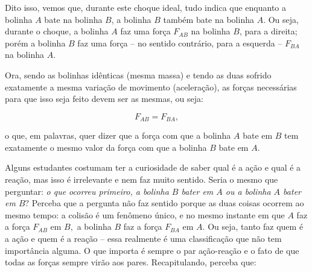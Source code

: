 Dito isso, vemos que, durante este choque ideal, tudo indica que enquanto a bolinha $A$ bate na bolinha $B$, a bolinha $B$ também bate na bolinha $A.$ Ou seja, durante o choque, a bolinha $A$ faz uma força $F_{AB}$ na bolinha $B$, para a direita; porém a bolinha $B$ faz uma força -- no sentido contrário, para a esquerda -- $F_{BA}$ na bolinha $A.$

Ora, sendo as bolinhas idênticas (mesma massa) e tendo as duas sofrido exatamente a mesma variação de movimento (aceleração), as forças necessárias para que isso seja feito devem ser as mesmas, ou seja:

$$ F_{AB} = F_{BA},$$

\noindent o que, em palavras, quer dizer que a força com que a bolinha $A$ bate em $B$ tem exatamente o mesmo valor da força com que a bolinha $B$ bate em $A$.

Alguns estudantes costumam ter a curiosidade de saber qual é a ação e qual é a reação, mas isso é irrelevante e nem faz muito sentido. Seria o mesmo que perguntar: \textit{o que ocorreu primeiro, a bolinha $B$ bater em $A$ ou a bolinha $A$ bater em $B?$} Perceba que a pergunta não faz sentido porque as duas coisas ocorrem ao mesmo tempo: a colisão é um fenômeno único, e no mesmo instante em que $A$ faz a força $F_{AB}$ em $B,$ a bolinha $B$ faz a força $F_{BA}$ em $A.$ Ou seja, tanto faz quem é a ação e quem é a reação -- essa realmente é uma classificação que não tem importância alguma. O que importa é sempre o par ação-reação e o fato de que todas as forças sempre virão aos pares. Recapitulando, perceba que:


